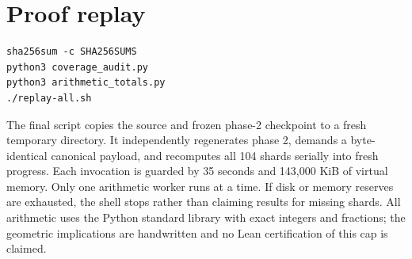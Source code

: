\documentclass[11pt,letterpaper]{article}
\begin{document}
\section{Proof replay}\label{proof-replay}

\begin{verbatim}
sha256sum -c SHA256SUMS
python3 coverage_audit.py
python3 arithmetic_totals.py
./replay-all.sh
\end{verbatim}

The final script copies the source and frozen phase-2 checkpoint to a
fresh temporary directory. It independently regenerates phase 2, demands
a byte-identical canonical payload, and recomputes all 104 shards
serially into fresh progress. Each invocation is guarded by 35 seconds
and 143,000 KiB of virtual memory. Only one arithmetic worker runs at a
time. If disk or memory reserves are exhausted, the shell stops rather
than claiming results for missing shards. All arithmetic uses the Python
standard library with exact integers and fractions; the geometric
implications are handwritten and no Lean certification of this cap is
claimed.
\end{document}
